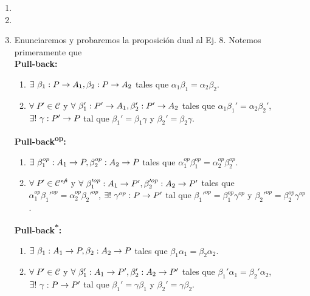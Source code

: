 \documentclass{article}
\begin{document}
\begin{enumerate}[label=\textbf{Ej \arabic*.}]
\begin{proof}
		\begin{equation*}
			\commutativesquare{up=t, P=A_2, A=P,B=A_2,C=A_1,D=A,f=\beta_2,g=\beta_1,h=\alpha_2,k=\alpha_1, l=1_{A_2},m=\alpha,n=\exists !\ \gamma,},
		\end{equation*}
		del cual se deduce que en partícular $\beta_2\gamma=1_{A_2}$, y así se tiene lo deseado.\\
		\end{proof}
		\item 
		\item
		\item Enunciaremos y probaremos la proposición dual al Ej. 8. Notemos primeramente que\\
		\textbf{Pull-back:}\begin{enumerate}[label=PB\Roman*)]
			\item $\exists\ \catarrow{\beta_1}{P}{A_1}{},\catarrow{\beta_2}{P}{A_2}{}$ tales que $\alpha_1\beta_1=\alpha_2\beta_2$.
			\item $\forall\ P'\in\mathscr{C}$ y $\forall\ \catarrow{\beta_1'}{P'}{A_1}{},\catarrow{\beta_2'}{P'}{A_2}{}$ tales que $\alpha_1\beta_1'=\alpha_2\beta_2'$, $\exists !\ \catarrow{\gamma}{P'}{P}{}$ tal que $\beta_1'=\beta_1\gamma$ y $\beta_2'=\beta_2\gamma$.
		\end{enumerate}
		\textbf{Pull-back\textsuperscript{op}:}\begin{enumerate}[label=PB\textsuperscript{op}\Roman*)]
		\item $\exists\ \catarrow{\beta_1^{op}}{A_1}{P}{},\catarrow{\beta_2^{op}}{A_2}{P}{}$ tales que $\alpha_1^{op}\beta_1^{op}=\alpha_2^{op}\beta_2^{op}$.
		\item $\forall\ P'\in\mathscr{C^{op}}$ y $\forall\ \catarrow{\beta_1'^{op}}{A_1}{P'}{},\catarrow{\beta_2'^{op}}{A_2}{P'}{}$ tales que $\alpha_1^{op}\beta_1'^{op}=\alpha_2^{op}\beta_2'^{op}$, $\exists !\ \catarrow{\gamma^{op}}{P}{P'}{}$ tal que $\beta_1'^{op}=\beta_1^{op}\gamma^{op}$ y $\beta_2'^{op}=\beta_2^{op}\gamma^{op}$.
	\end{enumerate}
	\textbf{Pull-back\textsuperscript{*}:}\begin{enumerate}[label=PB\textsuperscript{*}\Roman*)]
	\item $\exists\ \catarrow{\beta_1}{A_1}{P}{},\catarrow{\beta_2}{A_2}{P}{}$ tales que $\beta_1\alpha_1=\beta_2\alpha_2$.
	\item $\forall\ P'\in\mathscr{C}$ y $\forall\ \catarrow{\beta_1'}{A_1}{P'}{},\catarrow{\beta_2'}{A_2}{P'}{}$ tales que $\beta_1'\alpha_1=\beta_2'\alpha_2$, $\exists !\ \catarrow{\gamma}{P}{P'}{}$ tal que $\beta_1'=\gamma\beta_1$ y $\beta_2'=\gamma\beta_2$.

\end{enumerate}
\end{enumerate}
\end{document}
